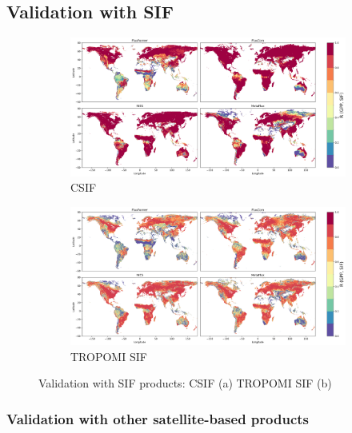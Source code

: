 \subsection{Validation with SIF}

\begin{figure}[p]
    \centering
    \begin{subfigure}{\textwidth}
      \centering
      \includegraphics[width=\textwidth]{figs/chap6/val_CSIF.png}
      \caption{CSIF}
      \label{fig:chap6_fig5a}
    \end{subfigure}

    \begin{subfigure}{\textwidth}
      \centering
      \includegraphics[width=\textwidth]{figs/chap6/val_TROPOMI_SIF.png}
      \caption{TROPOMI SIF}
      \label{fig:chap6_fig5b}
    \end{subfigure}
    \caption[Validation with SIF products]{Validation with SIF products: CSIF (a) TROPOMI SIF (b)}
    \label{fig:chap6_fig5}
\end{figure}


\subsubsection*{Validation with other satellite-based products}

